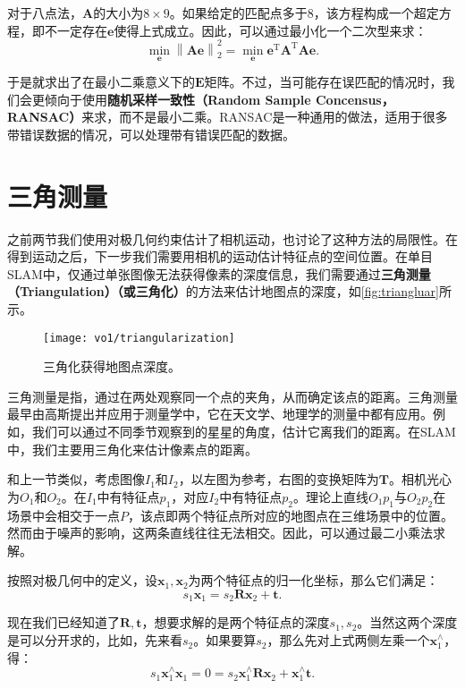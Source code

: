 对于八点法，$\bm{A}$的大小为$8 \times 9$。如果给定的匹配点多于$8$，该方程构成一个超定方程，即不一定存在$\bm{e}$使得上式成立。因此，可以通过最小化一个二次型来求：
\begin{equation}
\mathop {\min }\limits_{\bm{e}} \left\| \bm{Ae} \right\|_2^2 = \mathop {\min }\limits_{\bm{e}} { \bm{e}^\mathrm{T}} {\bm{A}^\mathrm{T}} \bm{Ae}.
\end{equation}

于是就求出了在最小二乘意义下的$\bm{E}$矩阵。不过，当可能存在误匹配的情况时，我们会更倾向于使用\textbf{随机采样一致性（Random Sample Concensus，RANSAC）}来求，而不是最小二乘。RANSAC是一种通用的做法，适用于很多带错误数据的情况，可以处理带有错误匹配的数据。

\section{三角测量}
之前两节我们使用对极几何约束估计了相机运动，也讨论了这种方法的局限性。在得到运动之后，下一步我们需要用相机的运动估计特征点的空间位置。在单目SLAM中，仅通过单张图像无法获得像素的深度信息，我们需要通过\textbf{三角测量（Triangulation）（或三角化）}的方法来估计地图点的深度，如\autoref{fig:triangluar}所示。

\begin{figure}[!ht]
	\centering
	\texttt{[image: vo1/triangularization]}
	\caption{三角化获得地图点深度。}
	\label{fig:triangluar}
\end{figure}

三角测量是指，通过在两处观察同一个点的夹角，从而确定该点的距离。三角测量最早由高斯提出并应用于测量学中，它在天文学、地理学的测量中都有应用。例如，我们可以通过不同季节观察到的星星的角度，估计它离我们的距离。在SLAM中，我们主要用三角化来估计像素点的距离。

和上一节类似，考虑图像$I_{1}$和$I_{2}$，以左图为参考，右图的变换矩阵为$\bm{T}$。相机光心为$O_{1}$和$O_{2}$。在$I_{1}$中有特征点$p_{1}$，对应$I_{2}$中有特征点$p_{2}$。理论上直线$O_{1}p_{1}$与$O_{2}p_{2}$在场景中会相交于一点$P$，该点即两个特征点所对应的地图点在三维场景中的位置。然而由于噪声的影响，这两条直线往往无法相交。因此，可以通过最二小乘法求解。

按照对极几何中的定义，设$\bm{x}_1, \bm{x}_2$为两个特征点的归一化坐标，那么它们满足：
\begin{equation}
s_1 \bm{x}_1 = s_2  \bm{R} \bm{x}_2 + \bm{t}.  
\end{equation}

现在我们已经知道了$\bm{R}, \bm{t}$，想要求解的是两个特征点的深度$s_1, s_2$。当然这两个深度是可以分开求的，比如，先来看$s_2$。如果要算$s_2$，那么先对上式两侧左乘一个$\bm{x}_1^\wedge$，得：
\begin{equation}
\label{eq:x1tox2}
s_1 \bm{x}_1^\wedge \bm{x}_1 = 0 = s_2 \bm{x}_1^\wedge \bm{R} \bm{x}_2 + \bm{x}_1^\wedge \bm{t}. 
\end{equation}

